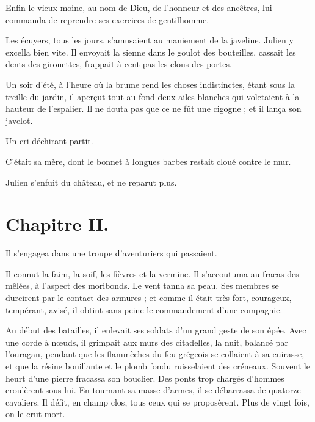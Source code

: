 \documentclass[]{book}
\begin{document}
                Enfin le vieux moine, au nom de Dieu, de l'honneur et des ancêtres, lui commanda de reprendre ses exercices de gentilhomme.
                    
                Les écuyers, tous les jours, s'amusaient au maniement de la javeline. Julien y excella bien vite. Il envoyait la sienne dans le goulot des bouteilles, cassait les dents des girouettes, frappait à cent pas les clous des portes.
                    
                Un soir d'été, à l'heure où la brume rend les choses indistinctes, étant sous la treille du jardin, il aperçut tout au fond deux ailes blanches qui voletaient à la hauteur de l'espalier. Il ne douta pas que ce ne fût une cigogne ; et il lança son javelot.
                    
                Un cri déchirant partit.
                    
                C'était sa mère, dont le bonnet à longues barbes restait cloué contre le mur.
                    
                Julien s'enfuit du château, et ne reparut plus. 
                    
                
            \chapter{Chapitre II.}
            
            Il s'engagea dans une troupe d'aventuriers qui passaient.
                    
                Il connut la faim, la soif, les fièvres et la vermine. Il s'accoutuma au fracas des mêlées, à l'aspect des moribonds. Le vent tanna sa peau. Ses membres se durcirent par le contact des armures ; et comme il était très fort, courageux, tempérant, avisé, il obtint sans peine le commandement d'une compagnie.
                    
                Au début des batailles, il enlevait ses soldats d'un grand geste de son épée. Avec une corde à nœuds, il grimpait aux murs des citadelles, la nuit, balancé par l'ouragan, pendant que les flammèches du feu grégeois se collaient à sa cuirasse, et que la résine bouillante et le plomb fondu ruisselaient des créneaux. Souvent le heurt d'une pierre fracassa son bouclier. Des ponts trop chargés d'hommes croulèrent sous lui. En tournant sa masse d'armes, il se débarrassa de quatorze cavaliers. Il défit, en champ clos, tous ceux qui se proposèrent. Plus de vingt fois, on le crut mort.
                    
\end{document}
